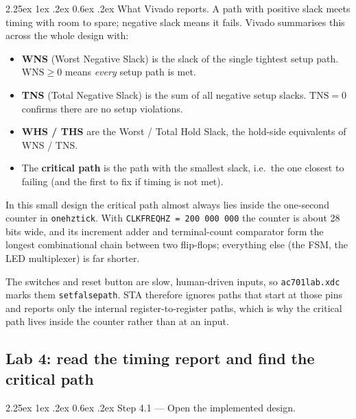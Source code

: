 \documentclass[11pt]{article}
\makeatletter
\renewcommand{\_}{\textunderscore\allowbreak}
\renewcommand\paragraph{\@startsection{paragraph}{4}{\z@}%
  {2.25ex \@plus 1ex \@minus .2ex}%
  {0.6ex \@plus .2ex}%
  {\normalfont\normalsize\bfseries}}
\makeatother
\begin{document}
\paragraph{What Vivado reports.}
A path with positive slack meets timing with room to spare; negative slack means it fails. Vivado summarises
this across the whole design with:
\begin{itemize}[noitemsep]
  \item \textbf{WNS} (Worst Negative Slack) is the slack of the single tightest
        setup path. $\mathrm{WNS} \ge 0$ means \emph{every} setup path is met.
  \item \textbf{TNS} (Total Negative Slack) is the sum of all negative setup
        slacks. $\mathrm{TNS} = 0$ confirms there are no setup violations.
  \item \textbf{WHS / THS} are the Worst / Total Hold Slack, the hold-side
        equivalents of WNS / TNS.
  \item The \textbf{critical path} is the path with the smallest slack, i.e.\ the
        one closest to failing (and the first to fix if timing is not met).
\end{itemize}
In this small design the critical path almost always lies inside the one-second counter in
\texttt{one\_hz\_tick}. With \texttt{CLK\_FREQ\_HZ = 200\,000\,000} the counter is about 28 bits wide, and
its increment adder and terminal-count comparator form the longest combinational chain between two
flip-flops; everything else (the FSM, the LED multiplexer) is far shorter.

\begin{notebox}
The switches and reset button are slow, human-driven inputs, so \texttt{ac701\_lab.xdc} marks them
\texttt{set\_false\_path}. STA therefore ignores paths that start at those pins and reports only the internal
register-to-register paths, which is why the critical path lives inside the counter rather than at an input.
\end{notebox}

\subsection{Lab 4: read the timing report and find the critical path}

\paragraph{Step 4.1 --- Open the implemented design.}
\end{document}
